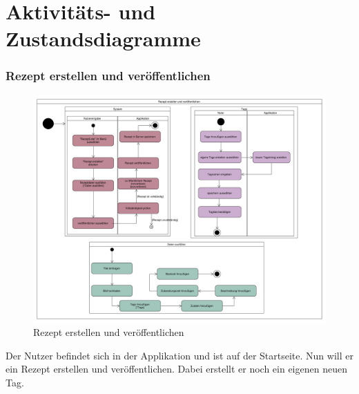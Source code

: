 \chapter{Aktivitäts- und Zustandsdiagramme}

\subsection{Rezept erstellen und veröffentlichen}
\begin{figure}[H]
	\centering
	\includegraphics[width=\textwidth]{pics/dynamicDiagram/AktivitaetsdiagrammRezepterstellen.pdf}%
	\caption{Rezept erstellen und veröffentlichen}%
	\label{diagram}%
\end{figure}



Der Nutzer befindet sich in der Applikation und ist auf der Startseite. Nun will er ein Rezept erstellen und veröffentlichen. Dabei erstellt er noch ein eigenen neuen Tag. 


